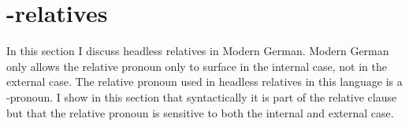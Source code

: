 





\section{-relatives}


In this section I discuss headless relatives in Modern German. Modern German only allows the relative pronoun only to surface in the internal case, not in the external case. The relative pronoun used in headless relatives in this language is a -pronoun. I show in this section that syntactically it is part of the relative clause but that the relative pronoun is sensitive to both the internal and external case.

